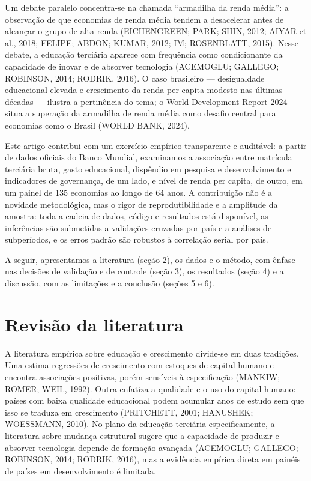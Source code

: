 \documentclass[12pt,a4paper]{article}
\begin{document}
Um debate paralelo concentra-se na chamada ``armadilha da renda média'': a observação de que economias de renda média tendem a desacelerar antes de alcançar o grupo de alta renda (EICHENGREEN; PARK; SHIN, 2012; AIYAR et al., 2018; FELIPE; ABDON; KUMAR, 2012; IM; ROSENBLATT, 2015). Nesse debate, a educação terciária aparece com frequência como condicionante da capacidade de inovar e de absorver tecnologia (ACEMOGLU; GALLEGO; ROBINSON, 2014; RODRIK, 2016). O caso brasileiro --- desigualdade educacional elevada e crescimento da renda per capita modesto nas últimas décadas --- ilustra a pertinência do tema; o World Development Report 2024 situa a superação da armadilha de renda média como desafio central para economias como o Brasil (WORLD BANK, 2024).

Este artigo contribui com um exercício empírico transparente e auditável: a partir de dados oficiais do Banco Mundial, examinamos a associação entre matrícula terciária bruta, gasto educacional, dispêndio em pesquisa e desenvolvimento e indicadores de governança, de um lado, e nível de renda per capita, de outro, em um painel de 135 economias ao longo de 64 anos. A contribuição não é a novidade metodológica, mas o rigor de reprodutibilidade e a amplitude da amostra: toda a cadeia de dados, código e resultados está disponível, as inferências são submetidas a validações cruzadas por país e a análises de subperíodos, e os erros padrão são robustos à correlação serial por país.

A seguir, apresentamos a literatura (seção 2), os dados e o método, com ênfase nas decisões de validação e de controle (seção 3), os resultados (seção 4) e a discussão, com as limitações e a conclusão (seções 5 e 6).

\section{Revisão da literatura}

A literatura empírica sobre educação e crescimento divide-se em duas tradições. Uma estima regressões de crescimento com estoques de capital humano e encontra associações positivas, porém sensíveis à especificação (MANKIW; ROMER; WEIL, 1992). Outra enfatiza a qualidade e o uso do capital humano: países com baixa qualidade educacional podem acumular anos de estudo sem que isso se traduza em crescimento (PRITCHETT, 2001; HANUSHEK; WOESSMANN, 2010). No plano da educação terciária especificamente, a literatura sobre mudança estrutural sugere que a capacidade de produzir e absorver tecnologia depende de formação avançada (ACEMOGLU; GALLEGO; ROBINSON, 2014; RODRIK, 2016), mas a evidência empírica direta em painéis de países em desenvolvimento é limitada.
\end{document}
